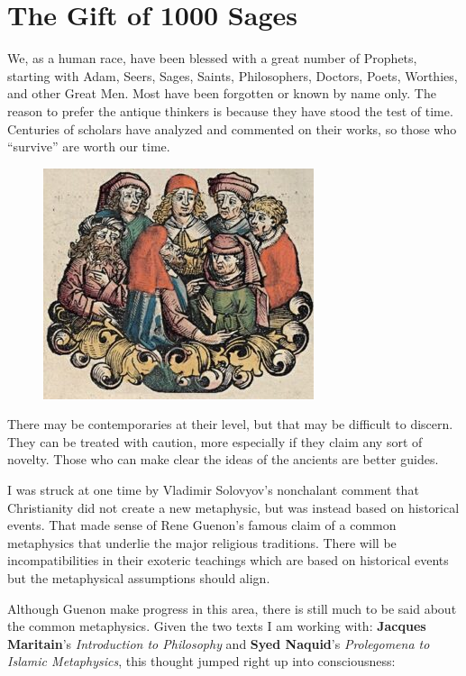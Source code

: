 \section{The Gift of 1000 Sages}

We, as a human race, have been blessed with a great number of Prophets, starting with Adam, Seers, Sages, Saints, Philosophers, Doctors, Poets, Worthies, and other Great Men. Most have been forgotten or known by name only. The reason to prefer the antique thinkers is because they have stood the test of time. Centuries of scholars have analyzed and commented on their works, so those who “survive” are worth our time.

\begin{figure}
 \includegraphics[scale=.5]{a20210908TheGiftof1000Sages-img001.jpg} 
\end{figure}

There may be contemporaries at their level, but that may be difficult to discern. They can be treated with caution, more especially if they claim any sort of novelty. Those who can make clear the ideas of the ancients are better guides.

I was struck at one time by Vladimir Solovyov's nonchalant comment that Christianity did not create a new metaphysic, but was instead based on historical events. That made sense of Rene Guenon's famous claim of a common metaphysics that underlie the major religious traditions. There will be incompatibilities in their exoteric teachings which are based on historical events but the metaphysical assumptions should align.

Although Guenon make progress in this area, there is still much to be said about the common metaphysics. Given the two texts I am working with: \textbf{Jacques Maritain}'s \emph{Introduction to Philosophy} and \textbf{Syed Naquid}'s \emph{Prolegomena to Islamic Metaphysics}, this thought jumped right up into consciousness:

